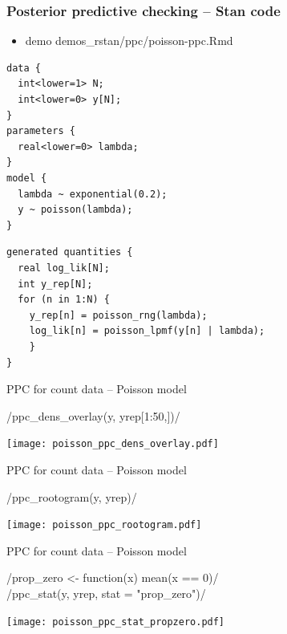 \documentclass[t]{beamer}
\begin{document}
\begin{frame}[fragile]
  \frametitle{Posterior predictive checking -- Stan code}

  \vspace{-0.2\parskip}
  \begin{itemize}
  \item demo demos\_rstan/ppc/poisson-ppc.Rmd
  \end{itemize}

  \vspace{-0.5\parskip}
\begin{verbatim}
data {
  int<lower=1> N;
  int<lower=0> y[N];
}
parameters {
  real<lower=0> lambda;
}
model {
  lambda ~ exponential(0.2);
  y ~ poisson(lambda);
}
\end{verbatim}
  \vspace{-\parskip}
\begin{verbatim}
generated quantities {
  real log_lik[N];
  int y_rep[N];
  for (n in 1:N) {
    y_rep[n] = poisson_rng(lambda);
    log_lik[n] = poisson_lpmf(y[n] | lambda);
    }
}
\end{verbatim}
\end{frame}

\begin{frame}{PPC for count data -- Poisson model}
  
  \vspace{-1\baselineskip}
  \rinline/ppc_dens_overlay(y, yrep[1:50,])/

    \texttt{[image: poisson\_ppc\_dens\_overlay.pdf]}

\end{frame}

\begin{frame}{PPC for count data -- Poisson model}
  
  \vspace{-1\baselineskip}
  \rinline/ppc_rootogram(y, yrep)/

    \texttt{[image: poisson\_ppc\_rootogram.pdf]}

\end{frame}

\begin{frame}{PPC for count data -- Poisson model}
  
  \vspace{-1\baselineskip}
  \rinline/prop_zero <- function(x) mean(x == 0)/\\
  \rinline/ppc_stat(y, yrep, stat = "prop_zero")/

    \texttt{[image: poisson\_ppc\_stat\_propzero.pdf]}

\end{frame}
\end{document}
